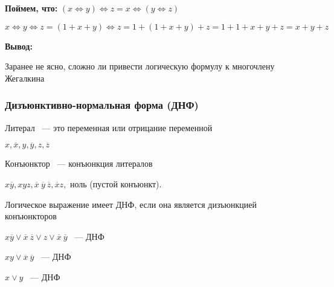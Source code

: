 \documentclass[russian]{lecture-notes}
\begin{document}
\begin{sloppypar}
        \textbf{Поймем, что:}
        $(x \Leftrightarrow y) \Leftrightarrow z = x \Leftrightarrow (y \Leftrightarrow z)$

        $x \Leftrightarrow y \Leftrightarrow z = (1 + x + y) \Leftrightarrow z = 1 + (1 + x + y) + z  = 1 + 1 + x + y + z = x + y + z $

        \textbf{Вывод:}

        Заранее не ясно, сложно ли привести логическую формулу к многочлену Жегалкина

        \subsubsection{Дизъюнктивно-нормальная форма (ДНФ)}

        \begin{definition}
            Литерал ~--- это переменная или отрицание переменной
        \end{definition}

        \begin{example}
            $x, \overline{x}, y, \overline{y}, z, \overline{z}$
        \end{example}

        \begin{definition}
            Конъюнктор ~--- конъюнкция литералов
        \end{definition}

        \begin{example}
            $x\overline{y}, xyz, \overline{x} \: \overline{y} \: \overline{z}, \overline{x}z,$ ноль (пустой конъюнкт).
        \end{example}

        \begin{definition}
            Логическое выражение имеет ДНФ, если она является дизъюнкцией конъюнкторов
        \end{definition}

        \begin{example}
            $x\overline{y} \lor \overline{x} \: \overline{z} \lor z \lor \overline{x} \: \overline{y}$ ~--- ДНФ
        \end{example}

        \begin{example}
            $xy \lor \overline{x} \: \overline{y}$ ~--- ДНФ
        \end{example}

        \begin{example}
            $x \lor y$ ~--- ДНФ
        \end{example}


\end{sloppypar}
\end{document}
